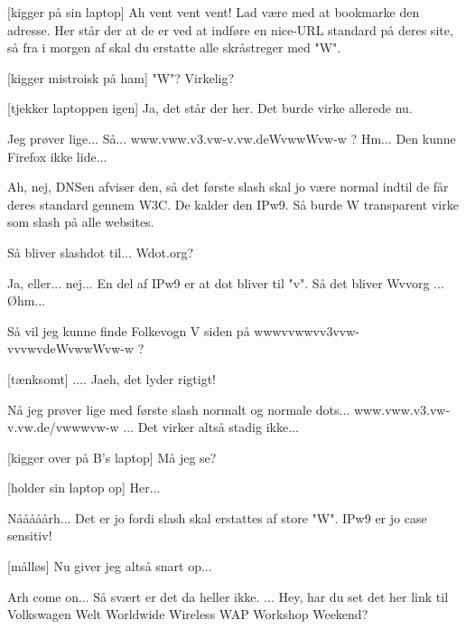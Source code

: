 \documentclass[a4paper,11pt]{article}
\begin{document}
\begin{sketch}
[kigger på sin laptop] Ah vent vent vent! Lad være med at bookmarke
den adresse. Her står der at de er ved at indføre en nice-URL standard
på deres site, så fra i morgen af skal du erstatte alle skråstreger
med "W".

[kigger mistroisk på ham] "W"? Virkelig?

[tjekker laptoppen igen] Ja, det står der her. Det burde virke allerede nu.


 Jeg prøver lige... Så... www.vww.v3.vw-v.vw.deWvwwWvw-w ? 
Hm... Den kunne Firefox ikke lide...

 Ah, nej, DNSen afviser den, så det første slash skal jo være
normal indtil de får deres standard gennem W3C. De kalder den IPw9. Så
burde W transparent virke som slash på alle websites.

 Så bliver slashdot til... Wdot.org?

 Ja, eller... nej... En del af IPw9 er at dot bliver til "v". Så det
bliver Wvvorg ... Øhm...

 Så vil jeg kunne finde Folkevogn V siden på wwwvvwwvv3vvw-vvvwvdeWvwwWvw-w ?

[tænksomt] .... Jaeh, det lyder rigtigt!


 Nå jeg prøver lige med første slash normalt og normale dots...
www.vww.v3.vw-v.vw.de/vwwwvw-w ... Det virker altså stadig ikke...

[kigger over på B's laptop] Må jeg se?

[holder sin laptop op] Her...

 Nååååårh... Det er jo fordi slash skal erstattes af store
"W". IPw9 er jo case sensitiv!

[målløs] Nu giver jeg altså snart op...

 Arh come on... Så svært er det da heller ikke.  ... Hey, har du set det her link til Volkswagen Welt
Worldwide Wireless WAP Workshop Weekend?

\end{sketch}
\end{document}
